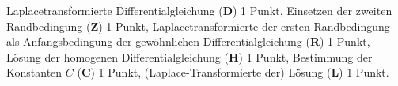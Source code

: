 \begin{bewertung}
Laplacetransformierte Differentialgleichung ({\bf D}) 1 Punkt,
Einsetzen der zweiten Randbedingung ({\bf Z}) 1 Punkt,
Laplacetransformierte der ersten Randbedingung als Anfangsbedingung
der gewöhnlichen Differentialgleichung ({\bf R}) 1 Punkt,
Lösung der homogenen Differentialgleichung ({\bf H}) 1 Punkt,
Bestimmung der Konstanten $C$ ({\bf C}) 1 Punkt,
(Laplace-Transformierte der) Lösung ({\bf L}) 1 Punkt.
\end{bewertung}
